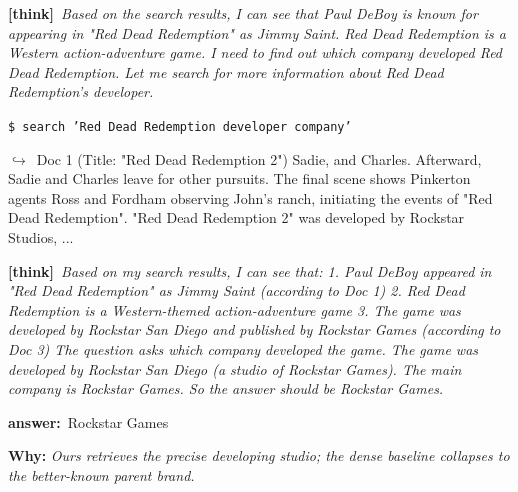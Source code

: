 \documentclass{article} %
\newcommand{\winbadge}{\colorbox{green!50!black}{\textcolor{white}{\scriptsize\bfseries\,WIN\,}}}
\newcommand{\thk}[1]{{\footnotesize\textcolor{violet!75!black}{\textbf{[think]}}\ \textit{#1}\par}}
\newcommand{\cmd}[1]{{\footnotesize\texttt{\textcolor{blue!35!black}{\$\ #1}}\par}}
\newcommand{\retr}[1]{{\footnotesize\textcolor{black!65}{\quad$\hookrightarrow$\ #1}\par}}
\newcommand{\ans}[1]{{\footnotesize\textbf{answer:}\ #1\par}}
\begin{document}
\begin{cmpbox}[label={ex:hotpot-rockstar},title={\winbadge\ \ \textsc{HotpotQA -- entity precision (subsidiary vs.\ parent)}}]
  \thk{Based on the search results, I can see that Paul DeBoy is known for appearing in "Red Dead Redemption" as Jimmy Saint. Red Dead Redemption is a Western action-adventure game. I need to find out which company developed Red Dead Redemption. Let me search for more information about Red Dead Redemption's developer.}
  \cmd{search 'Red Dead Redemption developer company'}
  \retr{Doc 1 (Title: "Red Dead Redemption 2") Sadie, and Charles. Afterward, Sadie and Charles leave for other pursuits. The final scene shows Pinkerton agents Ross and Fordham observing John's ranch, initiating the events of "Red Dead Redemption". "Red Dead Redemption 2" was developed by Rockstar Studios, ...}
  \thk{Based on my search results, I can see that: 1. Paul DeBoy appeared in "Red Dead Redemption" as Jimmy Saint (according to Doc 1) 2. Red Dead Redemption is a Western-themed action-adventure game 3. The game was developed by Rockstar San Diego and published by Rockstar Games (according to Doc 3) The question asks which company developed the game. The game was developed by Rockstar San Diego (a studio of Rockstar Games). The main company is Rockstar Games. So the answer should be Rockstar Games.}
  \ans{Rockstar Games}
\smallskip\par\textbf{Why:} \textit{Ours retrieves the precise developing studio; the dense baseline collapses to the better-known parent brand.}
\end{cmpbox}\bigskip
\end{document}
